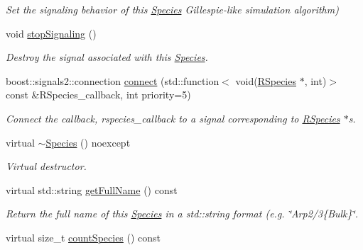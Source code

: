 \begin{DoxyCompactItemize}
\begin{DoxyCompactList}\small\item\em Set the signaling behavior of this \hyperlink{classchem_1_1Species}{Species} Gillespie-\/like simulation algorithm) \end{DoxyCompactList}\item 
void \hyperlink{classchem_1_1Species_a9d34195d05f3e35e00dd20892ff7393b}{stop\-Signaling} ()
\begin{DoxyCompactList}\small\item\em Destroy the signal associated with this \hyperlink{classchem_1_1Species}{Species}. \end{DoxyCompactList}\item 
boost\-::signals2\-::connection \hyperlink{classchem_1_1Species_a9a582e18e231a65761cb10c14d0a0a68}{connect} (std\-::function$<$ void(\hyperlink{classchem_1_1RSpecies}{R\-Species} $\ast$, int)$>$ const \&R\-Species\-\_\-callback, int priority=5)
\begin{DoxyCompactList}\small\item\em Connect the callback, rspecies\-\_\-callback to a signal corresponding to \hyperlink{classchem_1_1RSpecies}{R\-Species} $\ast$s. \end{DoxyCompactList}\item 
virtual \hyperlink{classchem_1_1Species_afb5803da12a3192f0c1b5bcbea4054d7}{$\sim$\-Species} () noexcept
\begin{DoxyCompactList}\small\item\em Virtual destructor. \end{DoxyCompactList}\item 
virtual std\-::string \hyperlink{classchem_1_1Species_a7ac7196a7146f63e297d0995c6081f4b}{get\-Full\-Name} () const 
\begin{DoxyCompactList}\small\item\em Return the full name of this \hyperlink{classchem_1_1Species}{Species} in a std\-::string format (e.\-g. \char`\"{}\-Arp2/3\{\-Bulk\}\char`\"{}. \end{DoxyCompactList}\item 
virtual size\-\_\-t \hyperlink{classchem_1_1Species_a5e8aedfe4c4b5e08fb0ee672c3d80ace}{count\-Species} () const 
\end{DoxyCompactItemize}
